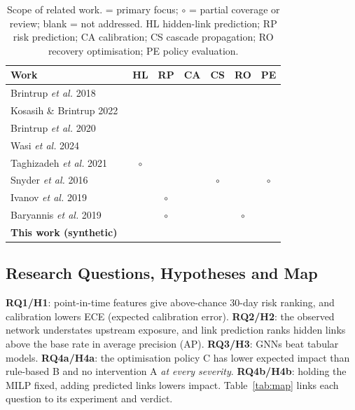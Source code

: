 \documentclass[conference]{IEEEtran}
\newcommand{\cmark}{\ding{51}}
\newcommand{\pmark}{$\circ$}
\begin{document}
\begin{table}[t]\centering\caption{Scope of related work. \cmark{} = primary focus; \pmark{} = partial coverage or review; blank = not addressed.
HL hidden-link prediction; RP risk prediction; CA calibration; CS cascade propagation; RO recovery optimisation; PE policy evaluation.}\label{tab:prior}
\scriptsize\setlength{\tabcolsep}{3.2pt}\begin{tabular}{@{}lcccccc@{}}\toprule
Work & HL & RP & CA & CS & RO & PE\\\midrule
Brintrup \emph{et al.} 2018~\cite{brintrup2018} & \cmark & & & & & \\
Kosasih \& Brintrup 2022~\cite{kosasih2022} & \cmark & & & & & \\
Brintrup \emph{et al.} 2020~\cite{brintrup2020} & & \cmark & & & & \\
Wasi \emph{et al.} 2024~\cite{wasi2024} & & \cmark & & & & \\
Taghizadeh \emph{et al.} 2021~\cite{taghizadeh2021} & \pmark & & & \cmark & & \cmark\\
Snyder \emph{et al.} 2016~\cite{snyder2016} & & & & \pmark & \cmark & \pmark\\
Ivanov \emph{et al.} 2019~\cite{ivanov2019} & & \pmark & & \cmark & & \\
Baryannis \emph{et al.} 2019~\cite{baryannis2019} & & \pmark & & & \pmark & \\
\rowcolor{gray!15}\textbf{This work (synthetic)} & \cmark & \cmark & \cmark & \cmark & \cmark & \cmark\\
\bottomrule\end{tabular}\end{table}

\subsection{Research Questions, Hypotheses and Map}
\textbf{RQ1/H1}: point-in-time features give above-chance 30-day risk ranking, and calibration lowers ECE (expected calibration error).
\textbf{RQ2/H2}: the observed network understates upstream exposure, and link prediction ranks hidden links above the base rate in average precision (AP).
\textbf{RQ3/H3}: GNNs beat tabular models. \textbf{RQ4a/H4a}: the optimisation policy C has lower expected impact than
rule-based B and no intervention A \emph{at every severity}. \textbf{RQ4b/H4b}: holding the MILP fixed, adding predicted links lowers impact.
Table~\ref{tab:map} links each question to its experiment and verdict.
\end{document}
